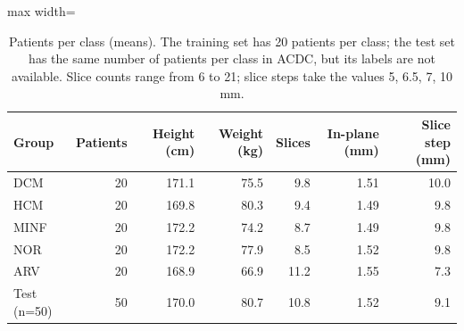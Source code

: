 \begin{table}[H]
\centering
\small
\setlength{\tabcolsep}{4pt}
\begin{adjustbox}{max width=\linewidth}
\begin{tabular}{lrrrrrr}
\toprule
Group & Patients & Height (cm) & Weight (kg) & Slices & In-plane (mm) & Slice step (mm) \\
\midrule
DCM & 20 & 171.1 & 75.5 & 9.8 & 1.51 & 10.0 \\
HCM & 20 & 169.8 & 80.3 & 9.4 & 1.49 & 9.8 \\
MINF & 20 & 172.2 & 74.2 & 8.7 & 1.49 & 9.8 \\
NOR & 20 & 172.2 & 77.9 & 8.5 & 1.52 & 9.8 \\
ARV & 20 & 168.9 & 66.9 & 11.2 & 1.55 & 7.3 \\
Test (n=50) & 50 & 170.0 & 80.7 & 10.8 & 1.52 & 9.1 \\
\bottomrule
\end{tabular}
\end{adjustbox}
\caption{Patients per class (means). The training set has 20 patients per class; the test set has the same number of patients per class in ACDC, but its labels are not available. Slice counts range from 6 to 21; slice steps take the values 5, 6.5, 7, 10 mm.}
\label{tab:supp-classes}
\end{table}
